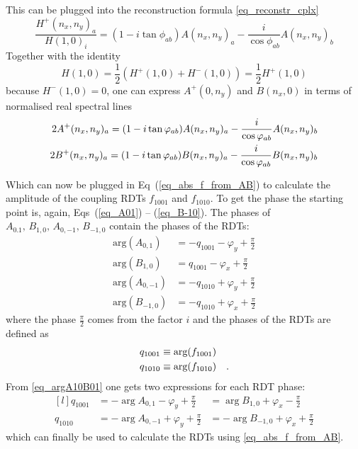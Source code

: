 %
This can be plugged into the reconstruction formula \eqref{eq_reconstr_cplx}
%
\begin{equation}
    \frac{H^+(n_x,n_y)_a}{H(1,0)_i} = (1-i\tan\phi_{ab})A(n_x,n_y)_a - \frac{i}{\cos\phi_{ab}}A(n_x,n_y)_b
    \label{eq_reconstr_from_norm}
\end{equation}
%
Together with the identity
%
\begin{equation}
    H(1,0) = \frac{1}{2} \left( H^+(1,0) + {H^-(1,0)}\right) = \frac{1}{2}H^+(1,0)
\end{equation}
%
because $H^-(1,0) = 0$, one can express $A^+(0,n_y)$ and $B(n_x, 0)$ in terms of normalised real spectral lines
%
\begin{align}
    2A^+(n_x,n_y)_a = (1-i\tan\phi_{ab})A(n_x,n_y)_a - \frac{i}{\cos\phi_{ab}}A(n_x,n_y)_b \notag \\
    2B^+(n_x,n_y)_a = (1-i\tan\phi_{ab})B(n_x,n_y)_a - \frac{i}{\cos\phi_{ab}}B(n_x,n_y)_b
    \label{eq_recon_AB}
\end{align}
%

Which can now be plugged in Eq~(\ref{eq_abs_f_from_AB}) to calculate the amplitude of the coupling RDTs
$f_{1001}$ and $f_{1010}$. To get the phase the starting point is, again, Eqs~(\ref{eq_A01}) -- (\ref{eq_B-10}).
The phases of $A_{0.1},\,B_{1,0},\,A_{0,-1},\,B_{-1,0}$ contain the phases of the RDTs:
%
\begin{align}
  \text{arg}(A_{0,1}) &= -q_{1001} -\varphi_y +\tfrac{\pi}{2} \\
  \text{arg}(B_{1,0}) &= q_{1001} -\varphi_x +\tfrac{\pi}{2} \\
  \text{arg}(A_{0,-1}) &= -q_{1010} +\varphi_y +\tfrac{\pi}{2} \\
  \text{arg}(B_{-1,0}) &= -q_{1010} +\varphi_x +\tfrac{\pi}{2}
  \label{eq_argA10B01}
\end{align}
%
where the phase $\frac{\pi}{2}$ comes from the factor $i$ and the phases of the RDTs are defined as
%
\begin{align}
  q_{1001} &\equiv \text{arg}(f_{1001})\\
  q_{1010} &\equiv \text{arg}(f_{1010})
  \fstop
  \label{eq_arg_f1001}
\end{align}
%
From \eqref{eq_argA10B01} one gets two expressions for each RDT phase:
%
\begin{equation}
  \begin{matrix*}[l]
  q_{1001} &= -\arg{A_{0,1}}-\varphi_y + \tfrac{\pi}{2} &= \arg{B_{1,0}}+\varphi_x -\tfrac{\pi}{2}\\
  q_{1010} &= -\arg{A_{0,-1}} +\varphi_y + \tfrac{\pi}{2} &= -\arg{B_{-1,0}}+\varphi_x +\tfrac{\pi}{2}
  \label{eq_q1001q1010}
  \end{matrix*}
\end{equation}
%
which can finally be used to calculate the RDTs using \eqref{eq_abs_f_from_AB}.

